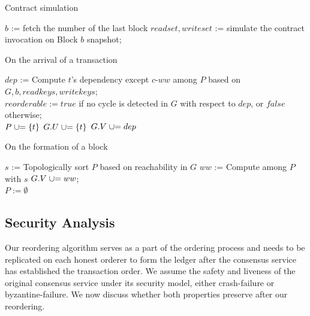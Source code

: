 \begin{algorithm}
  \caption{Contract simulation}
  \label{alg:txn:simulation}
  $b$ := fetch the number of the last block\;
  $readset, writeset$ := simulate the contract invocation on Block $b$
  snapshot; 
\end{algorithm}


\begin{algorithm}[tp]
  \caption{On the arrival of a transaction}
  \label{alg:txn:txn}
  $dep$ := Compute $t$'s dependency except $c$-$ww$ among $P$ based on $G, b, readkeys,
  writekeys$; \\
  $reorderable := true$ if no cycle is detected in $G$ with respect to $dep$,
  or $false$ otherwise;
  \\
   {
    $P \mathrel{{\cup}{=}} \{t\}$\;
    $G.U \mathrel{{\cup}{=}} \{t\}$\;
    $G.V \mathrel{{\cup}{=}} dep$\;
  }
\end{algorithm}

\begin{algorithm}
  \caption{On the formation of a block}
  \label{alg:txn:blk}
  $s$ := Topologically sort $P$ based on reachability in $G$\;
  $ww$ := Compute  among $P$ with $s$\;
  $G.V \mathrel{{\cup}{=}} ww$; \\
  $P := \emptyset$
\end{algorithm}

\subsection{Security Analysis}
\label{sec:txn:securityanalysis}
Our reordering algorithm serves as a part of the ordering process and needs to be replicated on each honest orderer to form the ledger after the consensus service has established the transaction order. 
%
We assume the safety and liveness of the original consensus service under its security model, either crash-failure or byzantine-failure.
%
We now discuss whether both properties preserve after our reordering. 

